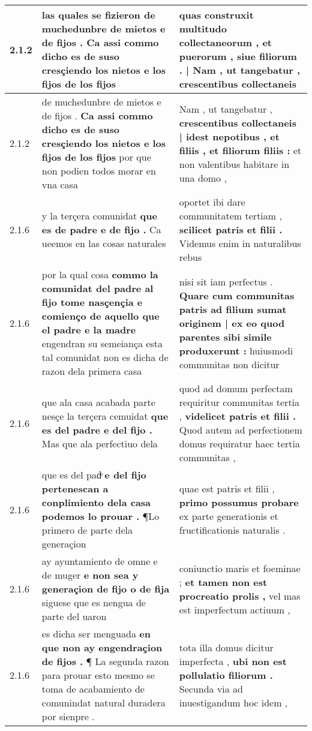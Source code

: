 \begin{tabular}{|p{1cm}|p{6.5cm}|p{6.5cm}|}
2.1.2 & las quales se fizieron \textbf{ de muchedunbre de mietos e de fijos . } Ca assi commo dicho es de suso cresçiendo los nietos e los fijos de los fijos & quas construxit multitudo collectaneorum , \textbf{ et puerorum , siue filiorum . | Nam , ut tangebatur , } crescentibus collectaneis \\\hline
2.1.2 & de muchedunbre de mietos e de fijos . \textbf{ Ca assi commo dicho es de suso cresçiendo los nietos e los fijos de los fijos } por que non podien todos morar en vna casa & Nam , ut tangebatur , \textbf{ crescentibus collectaneis | idest nepotibus , et filiis , et filiorum filiis : } et non valentibus habitare in una domo , \\\hline
2.1.6 & y la terçera comunidat \textbf{ que es de padre e de fijo . } Ca ueemos en las cosas naturales & oportet ibi dare communitatem tertiam , \textbf{ scilicet patris et filii . } Videmus enim in naturalibus rebus \\\hline
2.1.6 & por la qual cosa \textbf{ commo la comunidat del padre al fijo tome nasçençia e comienço de aquello que el padre e la madre } engendran su semeiança esta tal comunidat non es dicha de razon dela primera casa & nisi sit iam perfectus . \textbf{ Quare cum communitas patris ad filium sumat originem | ex eo quod parentes sibi simile produxerunt : } huiusmodi communitas non dicitur \\\hline
2.1.6 & que ala casa acabada parte nesçe la terçera cemuidat \textbf{ que es del padre e del fijo . } Mas que ala perfectiuo dela & quod ad domum perfectam requiritur communitas tertia , \textbf{ videlicet patris et filii . } Quod autem ad perfectionem domus requiratur haec tertia communitas , \\\hline
2.1.6 & que es del padͤ \textbf{ e del fijo pertenescan a conplimiento dela casa podemos lo prouar . } ¶Lo primero de parte dela generaçion & quae est patris et filii , \textbf{ primo possumus probare } ex parte generationis et fructificationis naturalis . \\\hline
2.1.6 & ay ayuntamiento de omne e de muger \textbf{ e non sea y generaçion de fijo o de fija } siguese que es nengua de parte del uaron & coniunctio maris et foeminae ; \textbf{ et tamen non est procreatio prolis , } vel mas est imperfectum actiuum , \\\hline
2.1.6 & es dicha ser menguada \textbf{ en que non ay engendraçion de fijos . } ¶ La segunda razon para prouar esto mesmo se toma de acabamiento de comunindat natural duradera por sienpre . & tota illa domus dicitur imperfecta , \textbf{ ubi non est pollulatio filiorum . } Secunda via ad inuestigandum hoc idem , \\\hline

\end{tabular}
